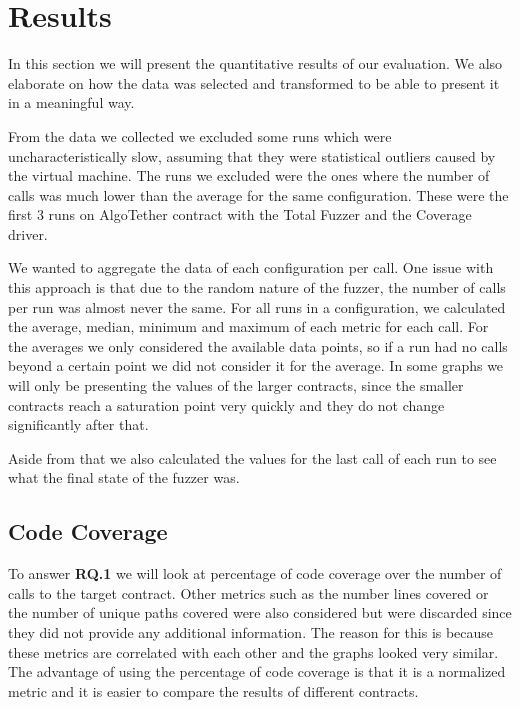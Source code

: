 \section{Results} \label{section:results}
In this section we will present the quantitative results of our evaluation.
We also elaborate on how the data was selected and transformed to be able to present it in a meaningful way.

From the data we collected we excluded some runs which were uncharacteristically slow, assuming that they were statistical outliers caused by the virtual machine.
The runs we excluded were the ones where the number of calls was much lower than the average for the same configuration.
These were the first 3 runs on AlgoTether contract with the Total Fuzzer and the Coverage driver.

We wanted to aggregate the data of each configuration per call.
One issue with this approach is that due to the random nature of the fuzzer, the number of calls per run was almost never the same.
For all runs in a configuration, we calculated the average, median, minimum and maximum of each metric for each call.
For the averages we only considered the available data points, so if a run had no calls beyond a certain point we did not consider it for the average.
In some graphs we will only be presenting the values of the larger contracts, since the smaller contracts reach a saturation point very quickly and they do not change significantly after that.

Aside from that we also calculated the values for the last call of each run to see what the final state of the fuzzer was.

\subsection*{Code Coverage}
To answer \textbf{RQ.1} we will look at percentage of code coverage over the number of calls to the target contract.
Other metrics such as the number lines covered or the number of unique paths covered were also considered but were discarded since they did not provide any additional information.
The reason for this is because these metrics are correlated with each other and the graphs looked very similar.
The advantage of using the percentage of code coverage is that it is a normalized metric and it is easier to compare the results of different contracts.


